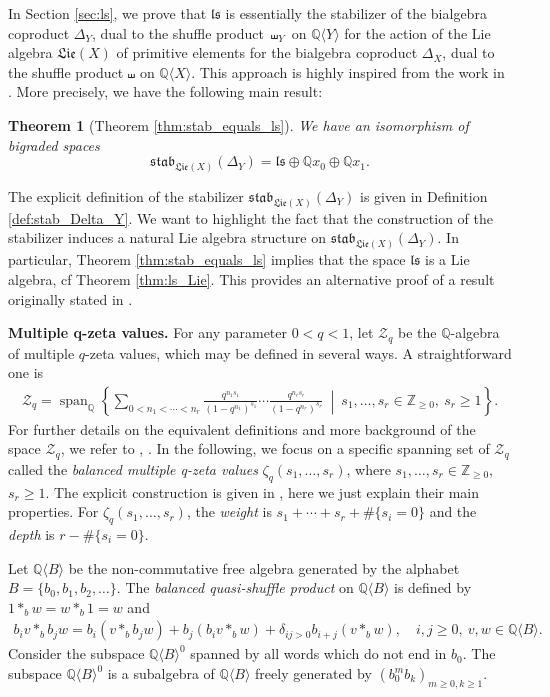 \documentclass[11pt, a4paper]{amsart}
\newtheorem{thm}{Theorem}
\numberwithin{equation}{section}
\theoremstyle{definition}
\newcommand{\Q}{\mathbb{Q}}
\newcommand{\QX}{\Q\langle X\rangle}
\newcommand{\QY}{\Q\langle Y\rangle}
\newcommand{\ls}{\mathfrak{ls}}
\newcommand{\qMZV}{\mathcal{Z}_q}
\newcommand{\QB}{\Q\langle B\rangle}
\newcommand{\Lie}{\mathfrak{Lie}}
\newcommand{\stab}{\mathfrak{stab}}
\newcommand{\Add}[1]{\textcolor{red}{#1}} %
\begin{document}
In Section \ref{sec:ls}, we prove that $\ls$ is essentially the stabilizer of the bialgebra coproduct $\Delta_Y$, dual to the shuffle product $\shuffle_Y$ on $\QY$ for the action of the Lie algebra $\Lie(X)$ of primitive elements for the bialgebra coproduct $\Delta_X$, dual to the shuffle product $\shuffle$ on $\QX$. This approach is highly inspired from the work in \cite{EF18}. More precisely, we have the following main result:
\begin{thm}[Theorem \ref{thm:stab_equals_ls}] We have an isomorphism of bigraded spaces
\[
\stab_{\Lie(X)}(\Delta_Y)=\ls\oplus\Q x_0\oplus \Q x_1.
\]
\end{thm}
The explicit definition of the stabilizer $\stab_{\Lie(X)}(\Delta_Y)$ is given in Definition \ref{def:stab_Delta_Y}. We want to highlight the fact that the construction of the stabilizer induces a natural Lie algebra structure on $\stab_{\Lie(X)}(\Delta_Y)$. In particular, Theorem \ref{thm:stab_equals_ls} implies that the space $\ls$ is a Lie algebra, cf Theorem \ref{thm:ls_Lie}. This provides an alternative proof of a result originally stated in \cite[Theorem~5.5]{Br21}.

\vspace{0.5cm}
\textbf{Multiple q-zeta values.} For any parameter $0<q<1$, let $\qMZV$ be the $\Q$-algebra of multiple $q$-zeta values, which may be defined in several ways. A straightforward one is
\begin{align*}
\qMZV=\operatorname{span}_\Q\left\{\sum_{0<n_1<\cdots<n_r}\frac{q^{n_1s_1}}{(1-q^{n_1})^{s_1}}\cdots \frac{q^{n_rs_r}}{(1-q^{n_r})^{s_r}}\ \middle|\ s_1,\ldots,s_r\in\mathbb{Z}_{\geq0},\ s_r\geq1\right\}.
\end{align*}
For further details on the equivalent definitions and more background of the space $\qMZV$, we refer to \cite{BK20}, \cite{Bu23}. In the following, we focus on a specific spanning set of $\qMZV$ called the
\emph{balanced multiple q-zeta values} $\zeta_q(s_1,\ldots,s_r)$, where $s_1,\ldots,s_r\in\mathbb{Z}_{\geq0}$, $s_r\geq1$. The explicit construction is given in \cite{Bu24}, here we just explain their main properties. For $\zeta_q(s_1,\ldots,s_r)$, the \emph{weight} is $s_1+\cdots+s_r+\#\{s_i=0\}$ and the \emph{depth} is $r-\#\{s_i=0\}$.

Let $\QB$ be the non-commutative free algebra generated by the alphabet $B=\{b_0,b_1,b_2,\ldots\}$. The \emph{balanced quasi-shuffle product} on $\QB$ is defined by $1\ast_b w= w\ast_b 1=w$ and
\begin{align*}
b_iv\ast_b b_jw=b_i(v\ast_b b_jw)+b_j(b_iv\ast_b w)+\delta_{ij>0} b_{i+j}(v\ast_b w), \quad i,j\geq0,\ v,w\in\QB.
\end{align*}
Consider the subspace $\QB^0$ spanned by all words which do not end in $b_0$. The subspace $\QB^0$ is a subalgebra of $\QB$ freely generated by $(b_0^{m}b_k)_{m\geq0, k\geq1}$.
\end{document}
